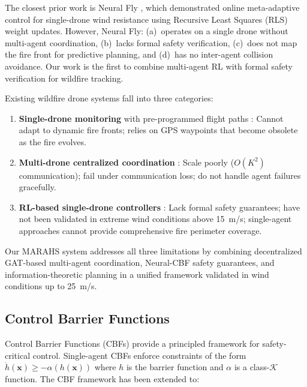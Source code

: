 \documentclass[12pt,a4paper]{article}
\DeclareRobustCommand{\cK}{\mathcal{K}}
\DeclareRobustCommand{\vect}[1]{\bm{#1}}
\begin{document}
The closest prior work is Neural Fly \cite{NeuralFly2022}, which demonstrated online meta-adaptive control for single-drone wind resistance using Recursive Least Squares (RLS) weight updates. However, Neural Fly: (a)~operates on a single drone without multi-agent coordination, (b)~lacks formal safety verification, (c)~does not map the fire front for predictive planning, and (d)~has no inter-agent collision avoidance. Our work is the first to combine multi-agent RL with formal safety verification for wildfire tracking.

Existing wildfire drone systems fall into three categories:
\begin{enumerate}[leftmargin=*]
    \item \textbf{Single-drone monitoring} with pre-programmed flight paths \cite{Fisher2016}: Cannot adapt to dynamic fire fronts; relies on GPS waypoints that become obsolete as the fire evolves.
    \item \textbf{Multi-drone centralized coordination} \cite{Prudden2018}: Scale poorly ($O(K^2)$ communication); fail under communication loss; do not handle agent failures gracefully.
    \item \textbf{RL-based single-drone controllers} \cite{PPO2017}: Lack formal safety guarantees; have not been validated in extreme wind conditions above 15~m/s; single-agent approaches cannot provide comprehensive fire perimeter coverage.
\end{enumerate}

Our MARAHS system addresses all three limitations by combining decentralized GAT-based multi-agent coordination, Neural-CBF safety guarantees, and information-theoretic planning in a unified framework validated in wind conditions up to 25~m/s.

\subsection{Control Barrier Functions}

Control Barrier Functions (CBFs) \cite{Ames2014,Ames2019} provide a principled framework for safety-critical control. Single-agent CBFs enforce constraints of the form $\dot{h}(\vect{x}) \geq -\alpha(h(\vect{x}))$ where $h$ is the barrier function and $\alpha$ is a class-$\cK$ function. The CBF framework has been extended to:
\end{document}
